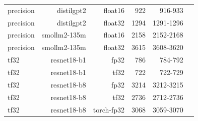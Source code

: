 \begin{tabular}{lrrrrr}
precision & distilgpt2 & float16 & 922 & 916-933 &  \\
precision & distilgpt2 & float32 & 1294 & 1291-1296 &  \\
precision & smollm2-135m & float16 & 2158 & 2152-2168 &  \\
precision & smollm2-135m & float32 & 3615 & 3608-3620 &  \\
tf32 & resnet18-b1 & fp32 & 786 & 784-792 &  \\
tf32 & resnet18-b1 & tf32 & 722 & 722-729 &  \\
tf32 & resnet18-b8 & fp32 & 3214 & 3212-3215 &  \\
tf32 & resnet18-b8 & tf32 & 2736 & 2712-2736 &  \\
tf32 & resnet18-b8 & torch-fp32 & 3068 & 3059-3070 &  \\
\bottomrule
\end{tabular}

